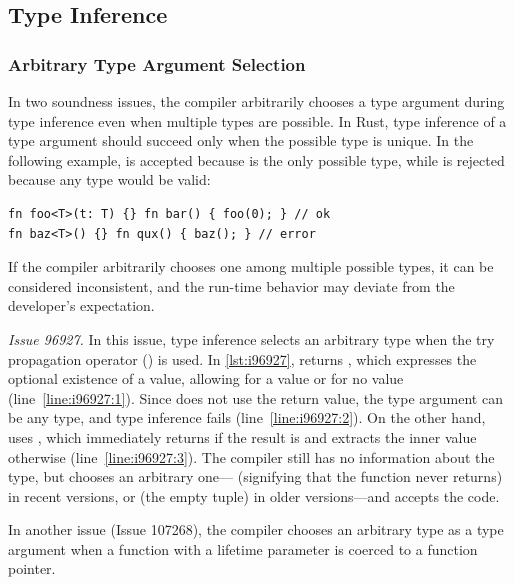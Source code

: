 \subsection{Type Inference}

\subsubsection{Arbitrary Type Argument Selection}

In two soundness issues, the compiler arbitrarily chooses a type argument during
type inference even when multiple types are possible.
%
In Rust, type inference of a type argument should succeed only when the possible
type is unique.
%
In the following example,  is accepted because  is the only
possible type, while  is rejected because any type would be valid:

\vspace{-0.5em}
\begin{lstlisting}
fn foo<T>(t: T) {} fn bar() { foo(0); } // ok
fn baz<T>() {} fn qux() { baz(); } // error
\end{lstlisting}
\vspace{-0.5em}

\noindent
%
If the compiler arbitrarily chooses one among multiple possible types, it can be
considered inconsistent, and the run-time behavior may deviate from the
developer's expectation.

{\it Issue 96927.}
%
In this issue, type inference selects an arbitrary type when the try propagation
operator () is used.
%
In \cref{lst:i96927},  returns , which expresses the
optional existence of a value, allowing  for a value or  for
no value (line~\ref{line:i96927:1}).
%
Since  does not use the return value, the type argument can be any type,
and type inference fails (line~\ref{line:i96927:2}).
%
On the other hand,  uses , which immediately returns  if the
result is  and extracts the inner value otherwise
(line~\ref{line:i96927:3}).
%
The compiler still has no information about the type, but chooses an arbitrary
one---\C{!} (signifying that the function never returns) in recent versions, or
\C{()} (the empty tuple) in older versions---and accepts the code.

In another issue (Issue 107268), the compiler chooses an arbitrary type as a
type argument when a function with a lifetime parameter is coerced to a function
pointer.

